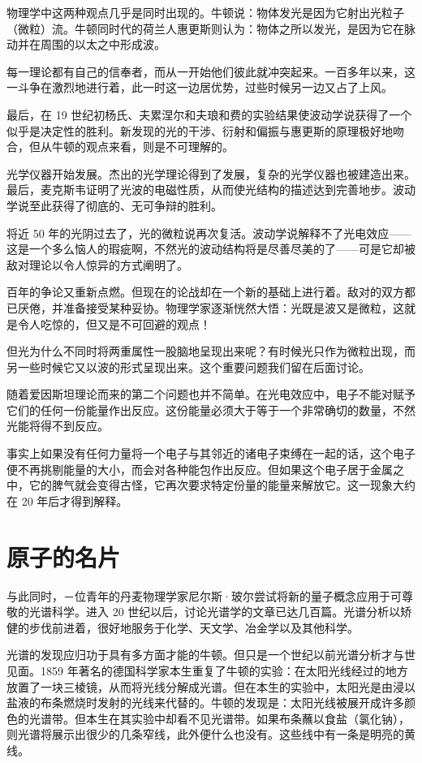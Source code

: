 物理学中这两种观点几乎是同时出现的。牛顿说：物体发光是因为它射出光粒子（微粒）流。牛顿同时代的荷兰人惠更斯则认为：物体之所以发光，是因为它在脉动并在周围的以太之中形成波。

每一理论都有自己的信奉者，而从一开始他们彼此就冲突起来。一百多年以来，这一斗争在激烈地进行着，此一时这一边居优势，过些时候另一边又占了上风。

最后，在 19 世纪初杨氏、夫累涅尔和夫琅和费的实验结果使波动学说获得了一个似乎是决定性的胜利。新发现的光的干涉、衍射和偏振与惠更斯的原理极好地吻合，但从牛顿的观点来看，则是不可理解的。

光学仪器开始发展。杰出的光学理论得到了发展，复杂的光学仪器也被建造出来。最后，麦克斯韦证明了光波的电磁性质，从而使光结构的描述达到完善地步。波动学说至此获得了彻底的、无可争辩的胜利。

将近 50 年的光阴过去了，光的微粒说再次复活。波动学说解释不了光电效应——这是一个多么恼人的瑕疵啊，不然光的波动结构将是尽善尽美的了——可是它却被敌对理论以令人惊异的方式阐明了。

百年的争论又重新点燃。但现在的论战却在一个新的基础上进行着。敌对的双方都已厌倦，并准备接受某种妥协。物理学家逐渐恍然大悟：光既是波又是微粒，这就是令人吃惊的，但又是不可回避的观点！

但光为什么不同时将两重属性一股脑地呈现出来呢？有时候光只作为微粒出现，而另一些时候它又以波的形式呈现出来。这个重要问题我们留在后面讨论。

随着爱因斯坦理论而来的第二个问题也并不简单。在光电效应中，电子不能对赋予它们的任何一份能量作出反应。这份能量必须大于等于一个非常确切的数量，不然光能将得不到反应。

事实上如果没有任何力量将一个电子与其邻近的诸电子束缚在一起的话，这个电子便不再挑剔能量的大小，而会对各种能包作出反应。但如果这个电子居于金属之中，它的脾气就会变得古怪，它再次要求特定份量的能量来解放它。这一现象大约在 20 年后才得到解释。

\section{原子的名片}

与此同时，－位青年的丹麦物理学家尼尔斯·玻尔尝试将新的量子概念应用于可尊敬的光谱科学。进入 20 世纪以后，讨论光谱学的文章已达几百篇。光谱分析以矫健的步伐前进着，很好地服务于化学、天文学、冶金学以及其他科学。

光谱的发现应归功于具有多方面才能的牛顿。但只是一个世纪以前光谱分析才与世见面。1859 年著名的德国科学家本生重复了牛顿的实验：在太阳光线经过的地方放置了一块三棱镜，从而将光线分解成光谱。但在本生的实验中，太阳光是由浸以盐液的布条燃烧时发射的光线来代替的。牛顿的发现是：太阳光线被展开成许多颜色的光谱带。但本生在其实验中却看不见光谱带。如果布条蘸以食盐（氯化钠），则光谱将展示出很少的几条窄线，此外便什么也没有。这些线中有一条是明亮的黄线。

